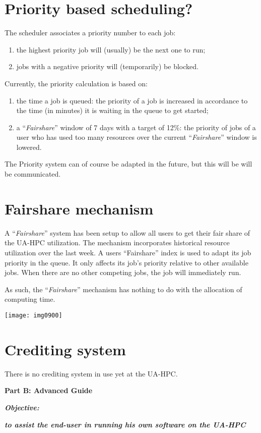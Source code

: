 \section{Priority based scheduling?}

The scheduler associates a priority number to each job:

\begin{enumerate}
\item  the highest priority job will (usually) be the next one to run;
\item  jobs with a negative priority will (temporarily) be blocked.
\end{enumerate}



Currently, the priority calculation is based on:

\begin{enumerate}
\item  the time a job is queued: the priority of a job is increased in accordance to the time (in minutes) it is waiting in the queue to get started;
\item  a ``\textit{Fairshare}'' window of 7 days with a target of 12\%: the priority of jobs of a user who has used too many resources over the current ``\textit{Fairshare}'' window is lowered.
\end{enumerate}

The Priority system can of course be adapted in the future, but this will be will be communicated.

\section{Fairshare mechanism}

A ``\textit{Fairshare}'' system has been setup to allow all users to get their fair share of the UA-HPC utilization.  The mechanism incorporates historical resource utilization over the last week.  A users ``Fairshare'' index is used to adapt its job priority in the queue.  It only affects its job's priority relative to other available jobs. When there are no other competing jobs, the job will immediately run.

As such, the ``\textit{Fairshare}'' mechanism has nothing to do with the allocation of computing time.

\texttt{[image: img0900]}

\section{Crediting system}

There is no crediting system in use yet at the UA-HPC.

\textbf{Part B: Advanced Guide}

\textbf{\textit{Objective:}}

\textbf{\textit{to assist the end-user in running his own software on the UA-HPC}}
